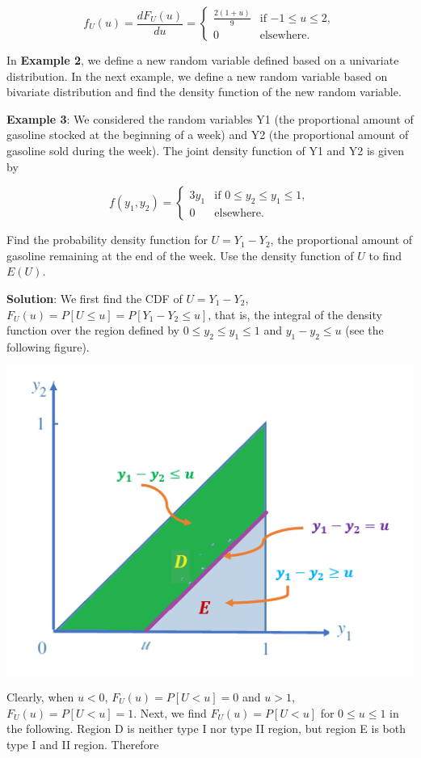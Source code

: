 \documentclass[
]{book}
\begin{document}
\[
\displaystyle f_U(u) = \frac{dF_U(u)}{du} = \begin{cases} 
 \frac{2(1+u)}{9} & \text{if $-1 \le u \le 2$}, \\ 
 0 & \text{elsewhere}.
 \end{cases}
\]

\hfill\break

In \textbf{Example 2}, we define a new random variable defined based on a univariate distribution. In the next example, we define a new random variable based on bivariate distribution and find the density function of the new random variable.

\textbf{\color{red}Example 3}: We considered the random variables Y1 (the proportional amount of gasoline stocked at the beginning of a week) and Y2 (the proportional amount of gasoline sold during the week). The joint density function of Y1 and Y2 is given by

\[
\displaystyle f(y_1, y_2) = \begin{cases} 
 3y_1 & \text{if $0 \le y_2 \le y_1 \le 1$}, \\ 
 0 & \text{elsewhere}.
 \end{cases}
\]

Find the probability density function for \(U = Y_1 - Y_2\), the proportional amount of gasoline remaining at the end of the week. Use the density function of \(U\) to find \(E(U)\).

\textbf{Solution}: We first find the CDF of \(U = Y_1 - Y_2\), \(F_U(u) = P[U \le u] = P[Y_1 - Y_2 \le u]\), that is, the integral of the density function over the region defined by \(0 \le y_2 \le y_1 \le 1\) and \(y_1 - y_2 \le u\) (see the following figure).

\begin{center}\includegraphics[width=0.4\linewidth]{topic10/example03IntegralRegion} \end{center}

Clearly, when \(u < 0\), \(F_U(u) = P[U < u] = 0\) and \(u > 1\), \(F_U(u) = P[U < u] = 1\). Next, we find \(F_U(u) = P[U < u]\) for \(0 \le u \le 1\) in the following. Region D is neither type I nor type II region, but region E is both type I and II region. Therefore
\end{document}
